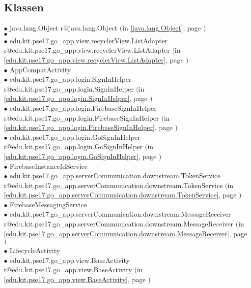 \documentclass[11pt,a4paper]{article}
\makeatletter
\newcommand{\refdefined}[1]{
\expandafter\ifx\csname r@#1\endcsname\relax
\relax\else
{$($in \ref{#1}, page \pageref{#1}$)$}\fi}
\makeatother
\begin{document}
\subsection*{Klassen}
{\raggedright
\hspace{0.0cm} $\bullet$ java.lang.Object {\tiny \refdefined{java.lang.Object}} \\
\hspace{1.0cm} $\bullet$  {\tiny } \\
\hspace{2.0cm} $\bullet$ edu.kit.pse17.go\_app.view.recyclerView.ListAdapter {\tiny \refdefined{edu.kit.pse17.go_app.view.recyclerView.ListAdapter}} \\
\hspace{1.0cm} $\bullet$ AppCompatActivity {\tiny } \\
\hspace{2.0cm} $\bullet$ edu.kit.pse17.go\_app.login.SignInHelper {\tiny \refdefined{edu.kit.pse17.go_app.login.SignInHelper}} \\
\hspace{3.0cm} $\bullet$ edu.kit.pse17.go\_app.login.FirebaseSignInHelper {\tiny \refdefined{edu.kit.pse17.go_app.login.FirebaseSignInHelper}} \\
\hspace{3.0cm} $\bullet$ edu.kit.pse17.go\_app.login.GoSignInHelper {\tiny \refdefined{edu.kit.pse17.go_app.login.GoSignInHelper}} \\
\hspace{1.0cm} $\bullet$ FirebaseInstanceIdService {\tiny } \\
\hspace{2.0cm} $\bullet$ edu.kit.pse17.go\_app.serverCommunication.downstream.TokenService {\tiny \refdefined{edu.kit.pse17.go_app.serverCommunication.downstream.TokenService}} \\
\hspace{1.0cm} $\bullet$ FirebaseMessagingService {\tiny } \\
\hspace{2.0cm} $\bullet$ edu.kit.pse17.go\_app.serverCommunication.downstream.MessageReceiver {\tiny \refdefined{edu.kit.pse17.go_app.serverCommunication.downstream.MessageReceiver}} \\
\hspace{1.0cm} $\bullet$ LifecycleActivity {\tiny } \\
\hspace{2.0cm} $\bullet$ edu.kit.pse17.go\_app.view.BaseActivity {\tiny \refdefined{edu.kit.pse17.go_app.view.BaseActivity}} \\
}
\end{document}
